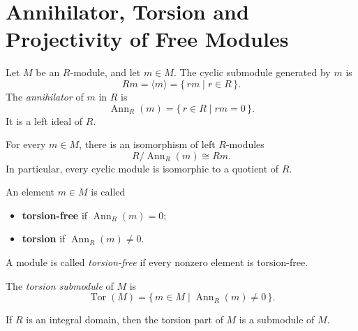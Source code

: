 \section{Annihilator, Torsion and Projectivity of Free Modules}

\begin{definition}
    Let $M$ be an $R$-module, and let $m \in M$. The cyclic submodule generated by $m$ is
    \[
        Rm = \langle m \rangle = \{\, rm \mid r \in R \,\}.
    \]
    The \emph{annihilator} of $m$ in $R$ is
    \[
        \operatorname{Ann}_R(m) = \{\, r \in R \mid rm = 0 \,\}.
    \]
    It is a left ideal of $R$.
\end{definition}

\begin{proposition}
    For every $m \in M$, there is an isomorphism of left $R$-modules
    \[
        R/\operatorname{Ann}_R(m) \cong Rm.
    \]
    In particular, every cyclic module is isomorphic to a quotient of $R$.
\end{proposition}

\begin{definition}
    An element $m \in M$ is called
    \begin{itemize}
        \item \textbf{torsion-free} if $\operatorname{Ann}_R(m) = 0$;
        \item \textbf{torsion} if $\operatorname{Ann}_R(m) \neq 0$.
    \end{itemize}
    A module is called \emph{torsion-free} if every nonzero element is torsion-free.
\end{definition}

\begin{definition}
    The \emph{torsion submodule} of $M$ is
    \[
        \operatorname{Tor}(M) = \{\, m \in M \mid \operatorname{Ann}_R(m) \neq 0 \,\}.
    \]
\end{definition}

\begin{lemma}
    If $R$ is an integral domain, then the torsion part of $M$ is a submodule of $M$.
\end{lemma}

